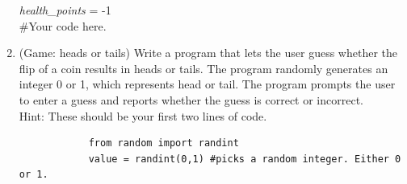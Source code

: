 \documentclass{article}
\begin{document}
\begin{enumerate}
		\vspace*{-6em}
		\textit{health\_points} = -1\\
		\#Your code here.
		\vspace*{3em}		


	\item 
		(Game: heads or tails)  Write a program that lets the user guess whether the flip of a coin 
		results in heads or tails.  The program randomly generates an integer 0 or 1, which 
		represents head or tail.  The program prompts the user to enter a guess and reports whether 
		the guess is correct or incorrect.\\
		Hint: These should be your first two lines of code.
		\begin{verbatim}
		    from random import randint
		    value = randint(0,1) #picks a random integer. Either 0 or 1.
		\end{verbatim}



\end{enumerate}
\end{document}
